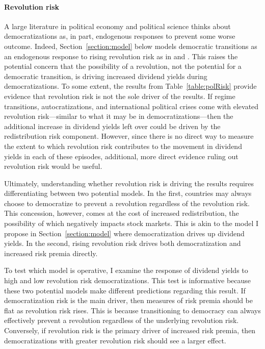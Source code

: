 \documentclass[12pt]{article}
\numberwithin{equation}{section}
\begin{document}
\paragraph{Revolution risk}
\label{par:rev_risk_beg}
A large literature in political economy and political science thinks about democratizations as, in part,  endogenous responses to prevent some worse outcome. Indeed, Section~\ref{section:model} below models democratic transitions as an endogenous response to rising revolution risk as in \cite{Boix2003} and \cite{Acemoglu2006}.  This raises the potential concern that the possibility of a revolution, not the potential for a democratic transition, is driving increased dividend yields during democratizations. To some extent, the results from Table~\ref{table:polRisk} provide evidence that revolution risk is not the sole driver of the results. If regime transitions, autocratizations, and international political crises come with elevated revolution risk---similar to what it may be in democratizations---then the additional increase in dividend yields left over could be driven by the redistribution risk component. However, since there is no direct way to measure the extent to which revolution risk contributes to the movement in dividend yields in each of these episodes, additional, more direct evidence ruling out revolution risk would be useful.

Ultimately, understanding whether revolution risk is driving the results requires differentiating between two potential models. In the first, countries may always choose to democratize to prevent a revolution regardless of the revolution risk. This concession, however, comes at the cost of increased redistribution, the possibility of which negatively impacts stock markets. This is akin to the model I propose in Section~\ref{section:model} where democratization drives up dividend yields. In the second, rising revolution risk drives both democratization and increased risk premia directly.

To test which model is operative, I examine the response of dividend yields to high and low revolution risk democratizations. This test is informative because these two potential models make different predictions regarding this result. If democratization risk is the main driver, then measures of risk premia should be flat as revolution risk rises.  This is because transitioning to democracy can always effectively prevent a revolution regardless of the underlying revolution risk. Conversely, if revolution risk is the primary driver of increased risk premia, then democratizations with greater revolution risk should see a larger effect.
\end{document}
